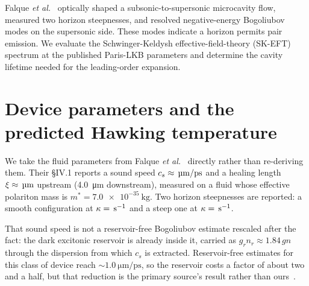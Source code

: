\documentclass[aps,prl,twocolumn,superscriptaddress,nofootinbib]{revtex4-2}
\begin{document}
Falque \emph{et al.}~\cite{Falque2025} optically shaped a subsonic-to-supersonic
microcavity flow, measured two horizon steepnesses, and resolved
negative-energy Bogoliubov modes on the supersonic side. These modes
indicate a horizon permits pair emission. We evaluate the
Schwinger-Keldysh effective-field-theory (SK-EFT) spectrum at the published
Paris-LKB parameters and determine the cavity lifetime needed for the
leading-order expansion.

\section{Device parameters and the predicted Hawking temperature}


We take the fluid parameters from Falque \emph{et al.}~\cite{Falque2025}
directly rather than re-deriving them. Their \S IV.1 reports a sound
speed $c_s \approx \unskip\,\si{\micro\meter/\pico\second}$
and a healing length $\xi \approx \unskip\,\si{\micro\meter}$
upstream (\SI{4.0}{\micro\meter} downstream), measured on a fluid whose
effective polariton mass is $m^* = \SI{7.0e-35}{\kilo\gram}$. Two
horizon steepnesses are reported: a smooth configuration at
$\kappa = \unskip\,\mathrm{s}^{-1}$ and a steep one at
$\kappa = \unskip\,\mathrm{s}^{-1}$.

That sound speed is not a reservoir-free Bogoliubov estimate
rescaled after the fact: the dark excitonic reservoir is already
inside it, carried as $g_r n_r \approx 1.84\,gn$ through the
dispersion from which $c_s$ is extracted. Reservoir-free estimates
for this class of device reach
$\sim \SI{1.0}{\micro\meter/\pico\second}$, so the reservoir costs a
factor of about two and a half, but that reduction is the primary
source's result rather than
ours~\cite{Estrecho2021,Stepanov2019,Claude2023}.
\end{document}

